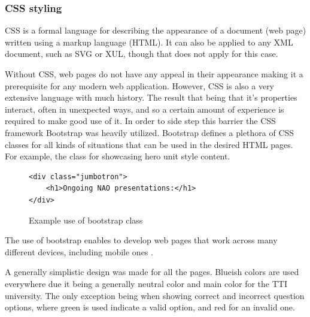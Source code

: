 \documentclass[12pt, fleqn, a4paper]{article}
\begin{document}
\subsubsection{CSS styling}
CSS is a formal language for describing the appearance of a document (web page) written using a markup language (HTML). It can also be applied to any XML document, such as SVG or XUL, though that does not apply for this case.\par
Without CSS, web pages do not have any appeal in their appearance making it a prerequisite for any modern web application. However, CSS is also a very extensive language with much history. The result that being that it's properties interact, often in unexpected ways, and so a certain amount of experience is required to make good use of it. 
In order to side step this barrier the CSS framework Bootstrap was heavily utilized. Bootstrap defines a plethora of CSS classes for all kinds of situations that can be used in the desired HTML pages. For example, the class  for showcasing hero unit style content.
\begin{figure}[H]
	\centering
	\begin{verbatim} 
<div class="jumbotron">
    <h1>Ongoing NAO presentations:</h1>
</div>
	\end{verbatim}
	\caption{Example use of bootstrap class}
\end{figure}
The use of bootstrap enables to develop web pages that work across many different devices, including mobile ones \citep{bootstrap}.\par
A generally simplistic design was made for all the pages. Blueish colors are used everywhere due it being a generally neutral color and main color for the TTI university. The only exception being when showing correct and incorrect question options, where green is used indicate a valid option, and red for an invalid one.\par
\end{document}
